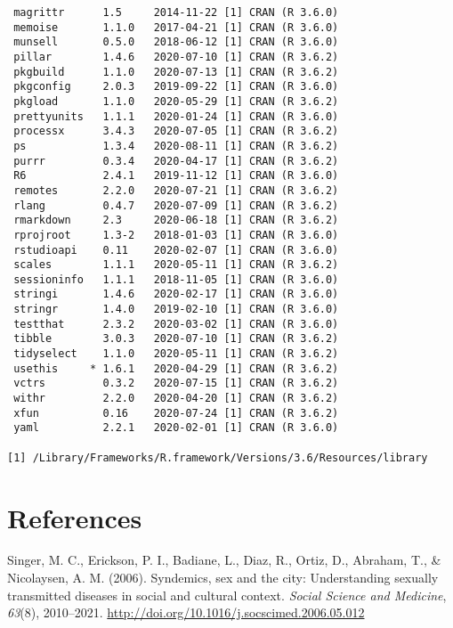 \documentclass [11pt, proquest] {uwthesis}[2015/03/03]
\begin{document}
\begin{verbatim}
 magrittr      1.5     2014-11-22 [1] CRAN (R 3.6.0)                       
 memoise       1.1.0   2017-04-21 [1] CRAN (R 3.6.0)                       
 munsell       0.5.0   2018-06-12 [1] CRAN (R 3.6.0)                       
 pillar        1.4.6   2020-07-10 [1] CRAN (R 3.6.2)                       
 pkgbuild      1.1.0   2020-07-13 [1] CRAN (R 3.6.2)                       
 pkgconfig     2.0.3   2019-09-22 [1] CRAN (R 3.6.0)                       
 pkgload       1.1.0   2020-05-29 [1] CRAN (R 3.6.2)                       
 prettyunits   1.1.1   2020-01-24 [1] CRAN (R 3.6.0)                       
 processx      3.4.3   2020-07-05 [1] CRAN (R 3.6.2)                       
 ps            1.3.4   2020-08-11 [1] CRAN (R 3.6.2)                       
 purrr         0.3.4   2020-04-17 [1] CRAN (R 3.6.2)                       
 R6            2.4.1   2019-11-12 [1] CRAN (R 3.6.0)                       
 remotes       2.2.0   2020-07-21 [1] CRAN (R 3.6.2)                       
 rlang         0.4.7   2020-07-09 [1] CRAN (R 3.6.2)                       
 rmarkdown     2.3     2020-06-18 [1] CRAN (R 3.6.2)                       
 rprojroot     1.3-2   2018-01-03 [1] CRAN (R 3.6.0)                       
 rstudioapi    0.11    2020-02-07 [1] CRAN (R 3.6.0)                       
 scales        1.1.1   2020-05-11 [1] CRAN (R 3.6.2)                       
 sessioninfo   1.1.1   2018-11-05 [1] CRAN (R 3.6.0)                       
 stringi       1.4.6   2020-02-17 [1] CRAN (R 3.6.0)                       
 stringr       1.4.0   2019-02-10 [1] CRAN (R 3.6.0)                       
 testthat      2.3.2   2020-03-02 [1] CRAN (R 3.6.0)                       
 tibble        3.0.3   2020-07-10 [1] CRAN (R 3.6.2)                       
 tidyselect    1.1.0   2020-05-11 [1] CRAN (R 3.6.2)                       
 usethis     * 1.6.1   2020-04-29 [1] CRAN (R 3.6.2)                       
 vctrs         0.3.2   2020-07-15 [1] CRAN (R 3.6.2)                       
 withr         2.2.0   2020-04-20 [1] CRAN (R 3.6.2)                       
 xfun          0.16    2020-07-24 [1] CRAN (R 3.6.2)                       
 yaml          2.2.1   2020-02-01 [1] CRAN (R 3.6.0)                       

[1] /Library/Frameworks/R.framework/Versions/3.6/Resources/library
\end{verbatim}
\backmatter

\chapter*{References}\label{references}


\noindent

\setlength{\parindent}{-0.20in} \setlength{\leftskip}{0.20in}
\setlength{\parskip}{8pt}

\hypertarget{refs}{}
\hypertarget{ref-Singer2006}{}
Singer, M. C., Erickson, P. I., Badiane, L., Diaz, R., Ortiz, D.,
Abraham, T., \& Nicolaysen, A. M. (2006). Syndemics, sex and the city:
Understanding sexually transmitted diseases in social and cultural
context. \emph{Social Science and Medicine}, \emph{63}(8), 2010--2021.
\url{http://doi.org/10.1016/j.socscimed.2006.05.012}
\end{document}
